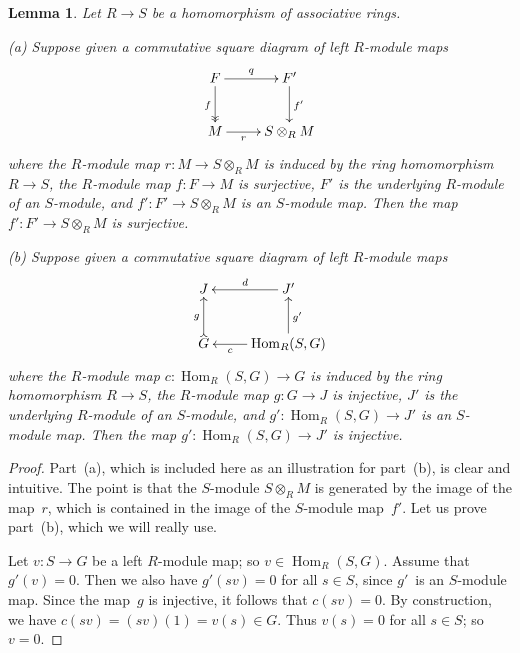 \documentclass[12pt,a4paper]{amsart}
\newcommand{\+}{\nobreakdash-}
\renewcommand{\:}{\colon}
\newcommand{\rarrow}{\longrightarrow}
\newcommand{\ot}{\otimes}
\DeclareMathOperator{\Hom}{Hom}
\theoremstyle{plain}
\newtheorem{lem}[thm]{Lemma}
\theoremstyle{definition}
\begin{document}
\begin{lem} \label{co-generation-square-lemma}
 Let $R\rarrow S$ be a homomorphism of associative rings. \par
\textup{(a)} Suppose given a commutative square diagram of
left $R$\+module maps
\begin{equation} \label{generation-square-diagram}
\begin{gathered}
 \xymatrix{
  F \ar[r]^-q \ar@{->>}[d]_f & F' \ar[d]^{f'} \\
  M \ar[r]_-r & S\ot_RM 
 }
\end{gathered}
\end{equation}
where the $R$\+module map\/ $r\:M\rarrow S\ot_RM$ is induced
by the ring homomorphism $R\rarrow S$, the $R$\+module map
$f\:F\rarrow M$ is surjective, $F'$ is the underlying $R$\+module of
an $S$\+module, and\/ $f'\:F'\rarrow S\ot_RM$ is an $S$\+module map.
 Then the map $f'\:F'\rarrow S\ot_RM$ is surjective. \par
\textup{(b)} Suppose given a commutative square diagram of
left $R$\+module maps
\begin{equation} \label{cogeneration-square-diagram}
\begin{gathered}
 \xymatrix{
  J & J' \ar[l]_-d \\
  G \ar@{>->}[u]^g & \Hom_R(S,G) \ar[l]^-c \ar[u]_{g'}
 }
\end{gathered}
\end{equation}
where the $R$\+module map\/ $c\:\Hom_R(S,G)\rarrow G$ is induced
by the ring homomorphism $R\rarrow S$, the $R$\+module map
$g\:G\rarrow J$ is injective, $J'$ is the underlying $R$\+module of
an $S$\+module, and\/ $g'\:\Hom_R(S,G)\rarrow J'$ is an $S$\+module map.
 Then the map $g'\:\Hom_R(S,G)\rarrow J'$ is injective.
\end{lem}

\begin{proof}
 Part~(a), which is included here as an illustration for part~(b),
is clear and intuitive.
 The point is that the $S$\+module $S\ot_RM$ is generated by
the image of the map~$r$, which is contained in the image of
the $S$\+module map~$f'$.
 Let us prove part~(b), which we will really use.

 Let $v\:S\rarrow G$ be a left $R$\+module map; so $v\in\Hom_R(S,G)$.
 Assume that $g'(v)=0$.
 Then we also have $g'(sv)=0$ for all $s\in S$, since $g'$~is
an $S$\+module map.
 Since the map~$g$ is injective, it follows that $c(sv)=0$.
 By construction, we have $c(sv)=(sv)(1)=v(s)\in G$.
 Thus $v(s)=0$ for all $s\in S$; so $v=0$.
\end{proof}
\end{document}
